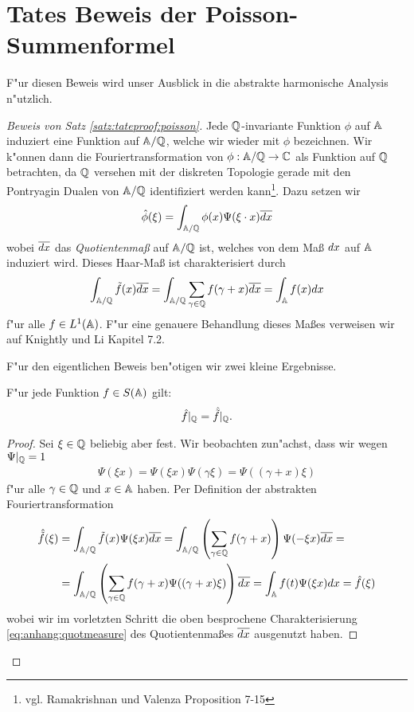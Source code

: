 \section{Tates Beweis der Poisson-Summenformel}
	F"ur diesen Beweis wird unser Ausblick in die abstrakte harmonische Analysis n"utzlich.
	\begin{proof}[Beweis von Satz \ref{satz:tateproof:poisson}]
		Jede $\mathbb{Q}$-invariante Funktion $\phi$ auf $\mathbb{A}$ induziert eine Funktion auf $\mathbb{A}/\mathbb{Q}$, welche wir wieder mit $\phi$ bezeichnen.
		Wir k"onnen dann die Fouriertransformation von $\phi: \mathbb{A}/\mathbb{Q} \rightarrow \mathbb{C}$ als Funktion auf $\mathbb{Q}$ betrachten, da $\mathbb{Q}$ versehen mit der diskreten Topologie gerade mit den Pontryagin Dualen von $\mathbb{A}/\mathbb{Q}$ identifiziert werden kann\footnote{vgl. Ramakrishnan und Valenza \cite{rama} Proposition 7-15}. 
		Dazu setzen wir
		\begin{align*}
			\hat{\phi}(\xi) = \int_{\mathbb{A}/\mathbb{Q}}\phi(x)\Psi(\xi \cdot x)\overline{d{x}}
		\end{align*}
		wobei $\overline{d{x}}$ das \emph{Quotientenmaß} auf $\mathbb{A}/\mathbb{Q}$ ist, welches von dem Maß $d{x}$ auf $\mathbb{A}$ induziert wird. 
		Dieses Haar-Maß ist charakterisiert durch
		\begin{align}\label{eq:anhang:quotmeasure}
			\int_{\mathbb{A}/\mathbb{Q}}\tilde{f}(x)\overline{d{x}} =
			\int_{\mathbb{A}/\mathbb{Q}}\sum_{\gamma \in \mathbb{Q}}f(\gamma+x)\overline{d{x}} =
			\int_{\mathbb{A}} f(x)d{x}
		\end{align}
		f"ur alle $f\in L^1(\mathbb{A})$. F"ur eine genauere Behandlung dieses Maßes verweisen wir auf Knightly und Li \cite{knightly} Kapitel 7.2.
		
		F"ur den eigentlichen Beweis ben"otigen wir zwei kleine Ergebnisse.
		\begin{lemma}\label{lemma:anhang:tate1}
			F"ur jede Funktion $f \in S(\mathbb{A})$ gilt:
			\begin{align*}
				\hat{f}|_{\mathbb{Q}} = \hat{\tilde{f}}|_{\mathbb{Q}}.
			\end{align*}
		\end{lemma}
		\begin{proof}
			Sei $\xi \in \mathbb{Q}$ beliebig aber fest. 
			Wir beobachten zun"achst, dass wir wegen $\Psi|_{\mathbb{Q}} =1$
			\begin{align*}
				\Psi(\xi x)= \Psi(\xi x)\Psi(\gamma \xi)=\Psi((\gamma + x) \xi)
			\end{align*}
			f"ur alle $\gamma \in \mathbb{Q}$ und $x\in \mathbb{A}$ haben. 
			Per Definition der abstrakten Fouriertransformation
			\begin{align*}
				\hat{\tilde{f}}(\xi)	
					&= \int_{\mathbb{A} / \mathbb{Q}} {\tilde{f}(x)\Psi(\xi x)\overline{d{x}}} 
					 = \int_{\mathbb{A} / \mathbb{Q}} \left(\sum_{\gamma \in \mathbb{Q}}{f(\gamma + x)}\right)\Psi(-\xi x)\overline{d{x}} =\\
					&= \int_{\mathbb{A} / \mathbb{Q}} \left(\sum_{\gamma \in \mathbb{Q}}{f(\gamma + x)}\Psi((\gamma + x)\xi)\right)\overline{d{x}}
					 = \int_{\mathbb{A}} f(t)\Psi(\xi x)d{x} = \hat{f}(\xi)
			\end{align*}
			wobei wir im vorletzten Schritt die oben besprochene Charakterisierung \eqref{eq:anhang:quotmeasure} des Quotientenmaßes $\overline{d{x}}$ ausgenutzt haben.
		\end{proof}
		

\end{proof}
